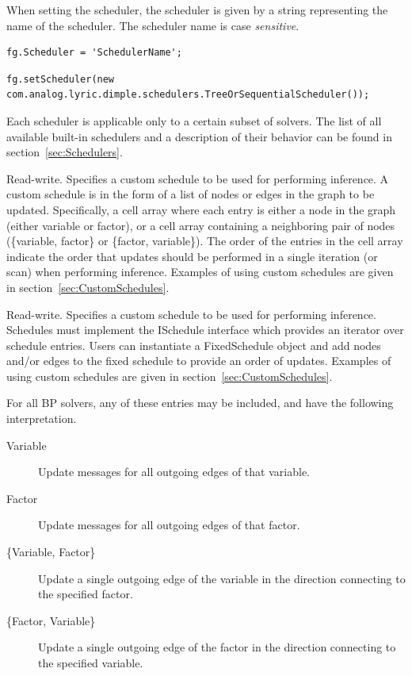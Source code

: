 When setting the scheduler, the scheduler is given by a string representing the name of the scheduler.  The scheduler name is case \emph{sensitive}.

\ifmatlab
\begin{lstlisting}
fg.Scheduler = 'SchedulerName';
\end{lstlisting}
\fi

\ifjava
\begin{lstlisting}
fg.setScheduler(new com.analog.lyric.dimple.schedulers.TreeOrSequentialScheduler());
\end{lstlisting}
\fi

Each scheduler is applicable only to a certain subset of solvers.  The list of all available built-in schedulers and a description of their behavior can be found in section~\ref{sec:Schedulers}.

\label{sec:FactorGraph.Schedule}

\ifmatlab
Read-write.  Specifies a custom schedule to be used for performing inference.  A custom schedule is in the form of a list of nodes or edges in the graph to be updated.  Specifically, a cell array where each entry is either a node in the graph (either variable or factor), or a cell array containing a neighboring pair of nodes (\{variable, factor\} or \{factor, variable\}).  The order of the entries in the cell array indicate the order that updates should be performed in a single iteration (or scan) when performing inference.  Examples of using custom schedules are given in section~\ref{sec:CustomSchedules}.
\fi

\ifjava
Read-write.  Specifies a custom schedule to be used for performing inference.  Schedules must implement the ISchedule interface which provides an iterator over schedule entries.  Users can instantiate a FixedSchedule object and add nodes and/or edges to the fixed schedule to provide an order of updates.  Examples of using custom schedules are given in section~\ref{sec:CustomSchedules}.
\fi

For all BP solvers, any of these entries may be included, and have the following interpretation.

\ifmatlab
\begin{description}
\item[Variable] Update messages for all outgoing edges of that variable.
\item[Factor] Update messages for all outgoing edges of that factor.
\item[\{Variable, Factor\}] Update a single outgoing edge of the variable in the direction connecting to the specified factor.
\item[\{Factor, Variable\}] Update a single outgoing edge of the factor in the direction connecting to the specified variable.
\end{description}
\fi

